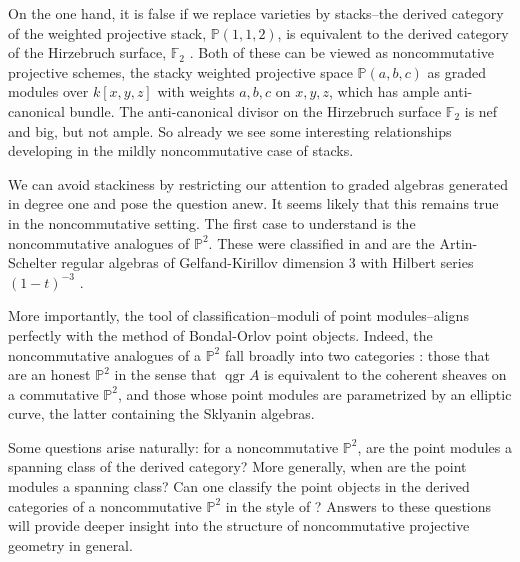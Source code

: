 \documentclass[11pt]{article}
\begin{document}
On the one hand, it is false if we replace varieties by stacks--the derived category of the weighted projective stack, $\mathbb{P}(1,1,2)$, is equivalent to the derived category of the Hirzebruch surface, $\mathbb{F}_2$ \cite{BF12}.
Both of these can be viewed as noncommutative projective schemes, the stacky weighted projective space $\mathbb{P}(a,b,c)$ as graded modules over $k[x,y,z]$ with weights $a,b,c$ on $x,y,z$, which has ample anti-canonical bundle.
The anti-canonical divisor on the Hirzebruch surface $\mathbb{F}_2$ is nef and big, but not ample.
So already we see some interesting relationships developing in the mildly noncommutative case of stacks.

We can avoid stackiness by restricting our attention to graded algebras generated in degree one and pose the question anew.
It seems likely that this remains true in the noncommutative setting.
The first case to understand is the noncommutative analogues of $\mathbb{P}^2$.
These were classified in \cite{ATV,Stephenson96,Stephenson97} and are the Artin-Schelter regular algebras \cite{AS87} of Gelfand-Kirillov dimension 3 with Hilbert series $(1-t)^{-3}$ \cite[Section 11]{SVdB01}.

More importantly, the tool of classification--moduli of point modules--aligns perfectly with the method of Bondal-Orlov point objects.
Indeed, the noncommutative analogues of a $\mathbb{P}^2$ fall broadly into two categories \cite{Stafford02}: those that are an honest $\mathbb{P}^2$ in the sense that $\operatorname{qgr} A$ is equivalent to the coherent sheaves on a commutative $\mathbb{P}^2$, and those whose point modules are parametrized by an elliptic curve, the latter containing the Sklyanin algebras.

Some questions arise naturally: for a noncommutative $\mathbb{P}^2$, are the point modules a spanning class of the derived category?
More generally, when are the point modules a spanning class?
Can one classify the point objects in the derived categories of a noncommutative $\mathbb{P}^2$ in the style of \cite{Bondal-Orlov}?
Answers to these questions will provide deeper insight into the structure of noncommutative projective geometry in general.

\end{document}
